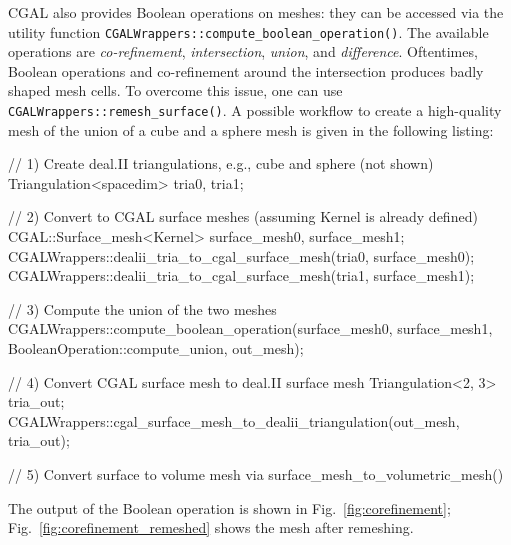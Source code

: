 \documentclass{ansarticle-preprint}
\begin{document}
CGAL also provides Boolean operations on meshes: they can be accessed via 
the utility function
\texttt{CGALWrappers::\allowbreak{}compute\_boolean\_operation()}. The
available operations are \textit{co-refinement}, \textit{intersection},
\textit{union}, and \textit{difference}. Oftentimes, Boolean
operations and co-refinement around the intersection produces
badly shaped mesh cells. To overcome this issue, one can use \texttt{CGALWrappers::\allowbreak{}remesh\_surface()}.
A possible workflow to create a high-quality mesh of the union of a cube and
a sphere mesh is given in the following listing:
\begin{c++}
// 1) Create deal.II triangulations, e.g., cube and sphere (not shown)  
Triangulation<spacedim> tria0, tria1;

// 2) Convert to CGAL surface meshes (assuming Kernel is already defined) 
CGAL::Surface_mesh<Kernel> surface_mesh0, surface_mesh1;
CGALWrappers::dealii_tria_to_cgal_surface_mesh(tria0, surface_mesh0);
CGALWrappers::dealii_tria_to_cgal_surface_mesh(tria1, surface_mesh1);

// 3) Compute the union of the two meshes
CGALWrappers::compute_boolean_operation(surface_mesh0, surface_mesh1,
  BooleanOperation::compute_union, out_mesh);

// 4) Convert CGAL surface mesh to deal.II surface mesh
Triangulation<2, 3> tria_out;
CGALWrappers::cgal_surface_mesh_to_dealii_triangulation(out_mesh, tria_out);

// 5) Convert surface to volume mesh via surface_mesh_to_volumetric_mesh()
\end{c++}
The output of the Boolean operation is shown in Fig.~\ref{fig:corefinement};
Fig.~\ref{fig:corefinement_remeshed} shows the mesh after remeshing.
\end{document}
